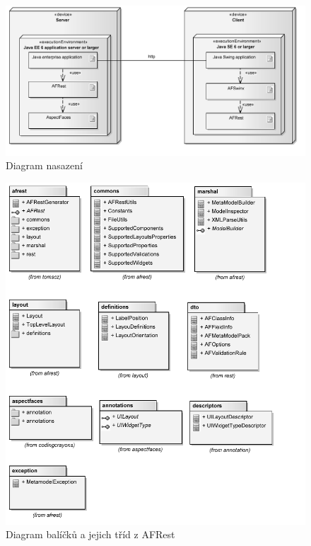 \documentclass[11pt,twoside,a4paper]{book}
\begin{document}
\begin{figure}
\begin{center}
\includegraphics{images/deploymentDiagram}
\caption{Diagram nasazení}
\label{img:deploymentFrameworkDiagram}
\end{center}
\end{figure}

\begin{figure}
\begin{center}
\includegraphics{images/serverSide}
\caption{Diagram balíčků a jejich tříd z AFRest}
\label{img:serverSide}
\end{center}
\end{figure}
\end{document}
